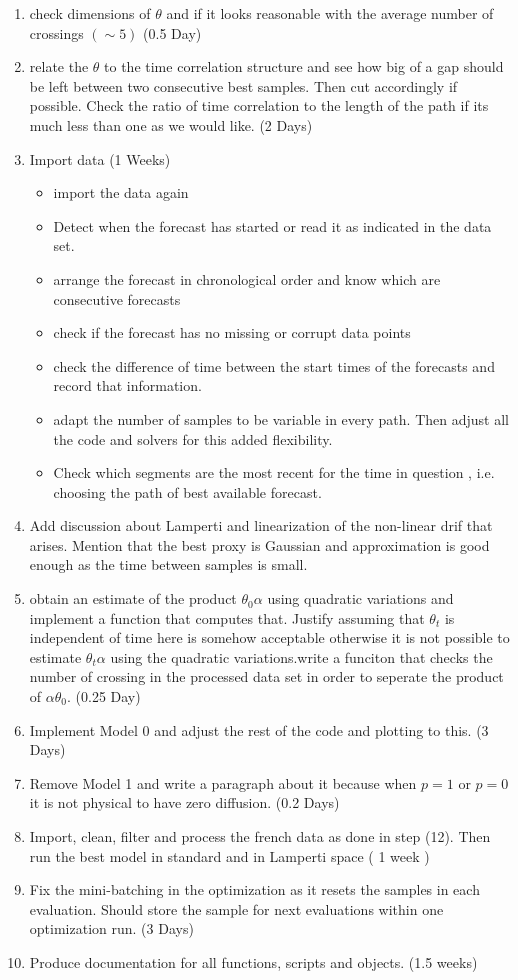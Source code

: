 \documentclass[12pt]{article}
\begin{document}
\begin{enumerate}
\item check dimensions of $\theta$ and if it looks reasonable with the average number of crossings $(\sim 5)$ (0.5 Day)
\item relate the $\theta$ to the time correlation structure and see how big of a gap should be left between two consecutive best samples. Then cut accordingly if possible. Check the ratio of time correlation to the length of the path if its much less than one as we would like. (2 Days)
\item Import data (1 Weeks)
\begin{itemize}
\item import the data again
\item Detect when the forecast has started or read it as indicated in the data set.
\item arrange the forecast in chronological order and  know which are consecutive forecasts
\item check if the forecast has no missing or corrupt data points
\item check the difference of time between the start times of the forecasts and record that information.
\item adapt the number of samples to be variable in every path. Then adjust all the code and solvers for this added flexibility.
\item Check which segments are the most recent for the time in question , i.e. choosing the path of best available forecast.
\end{itemize}
\item Add discussion about Lamperti and linearization of the non-linear drif that arises. Mention that the best proxy is Gaussian and approximation is good enough as the time between samples is small.
\item obtain an estimate of the product $\theta_0 \alpha$ using quadratic variations and implement a function that computes that. Justify assuming that $\theta_t$ is independent of time here is somehow acceptable otherwise it is not possible to estimate $\theta_t \alpha$ using the quadratic variations.write a funciton that checks the number of crossing in the processed data set in order to seperate the product of $\alpha \theta_0$. (0.25 Day)
\item Implement Model 0 and adjust the rest of the code and plotting to this. (3 Days)
\item Remove Model 1 and write a paragraph about it because when $p=1$ or $p=0$ it is not physical to have zero diffusion. (0.2 Days)
\item Import, clean, filter and process the french data as done in step (12). Then run the best model in standard and in Lamperti space ( 1 week )
\item Fix the mini-batching in the optimization as it resets the samples in each evaluation. Should store the sample for next evaluations within one optimization run. (3 Days)
\item Produce documentation for all functions, scripts and objects. (1.5 weeks)
\end{enumerate}
\end{document}
